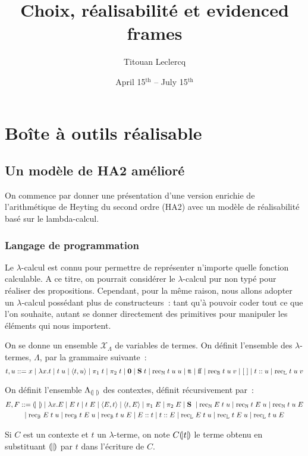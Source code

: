 \documentclass{article}
\title{Choix, réalisabilité et evidenced frames}
\author{Titouan Leclercq}
\date{April 15$^{\mathrm{th}}$ -- July 15$^{\mathrm{th}}$}
\begin{document}
\maketitle

\tableofcontents

\section{Boîte à outils réalisable}

\subsection{Un modèle de HA2 amélioré}

On commence par donner une présentation d'une version enrichie de l'arithmétique de Heyting du second ordre (HA2) avec un modèle de réalisabilité basé sur le lambda-calcul.

\subsubsection{Langage de programmation}

Le $\lambda$-calcul est connu pour permettre de représenter n'importe quelle fonction calculable. A ce titre, on pourrait considérer le $\lambda$-calcul pur non typé pour réaliser des propositions. Cependant, pour la même raison, nous allons adopter un $\lambda$-calcul possédant plus de constructeurs~: tant qu'à pouvoir coder tout ce que l'on souhaite, autant se donner directement des primitives pour manipuler les éléments qui nous importent.

\begin{defi}[$\Lambda$]
  On se donne un ensemble $\mathcal X_\Lambda$ de variables de termes. On définit l'ensemble des $\lambda$-termes, $\Lambda$, par la grammaire suivante~:
  \[t,u ::= x\mid\lambda x. t\mid t\;u\mid \langle t,u\rangle\mid \pi_1\;t\mid \pi_2\;t\mid \boldsymbol 0\mid \mathbf{S}\;t\mid \mathrm{rec}_{\mathbb{N}}\;t\;u\;u\mid \mathrm{t}\!\mathrm{t}\mid\mathrm{f}\!\mathrm{f}\mid\mathrm{rec}_{\mathbb{B}}\;t\;u\;v\mid [\;]\mid t:: u\mid \mathrm{rec}_{\mathbb{L}}\;t\;u\;v\]
\end{defi}

\begin{defi}[Contexte]
  On définit l'ensemble $\Lambda_{(\!| \;|\!)}$ des contextes, définit récursivement par~:
  \begin{multline*}
    E,F::= (\!| \ |\!)\mid \lambda x.E\mid E\;t\mid t\;E\mid \langle E,t\rangle\mid \langle t,E\rangle\mid \pi_1\;E\mid\pi_2\;E\mid\mathbf{S}\;\mid \mathrm{rec}_{\mathbb{N}}\;E\;t\;u\mid \mathrm{rec}_{\mathbb{N}}\;t\;E\;u\mid\mathrm{rec}_{\mathbb{N}}\;t\;u\;E\\\mid\mathrm{rec}_{\mathbb{B}}\;E\;t\;u\mid\mathrm{rec}_{\mathbb{B}}\;t\;E\;u\mid\mathrm{rec}_{\mathbb{B}}\;t\;u\;E\mid E::t\mid t::E\mid \mathrm{rec}_{\mathbb{L}}\;E\;t\;u\mid \mathrm{rec}_{\mathbb{L}}\;t\;E\;u\mid\mathrm{rec}_{\mathbb{L}}\;t\;u\;E
  \end{multline*}

  Si $C$ est un contexte et $t$ un $\lambda$-terme, on note $C(\!| t|\!)$ le terme obtenu en substituant $(\!| |\!)$ par $t$ dans l'écriture de $C$.
\end{defi}
\end{document}
